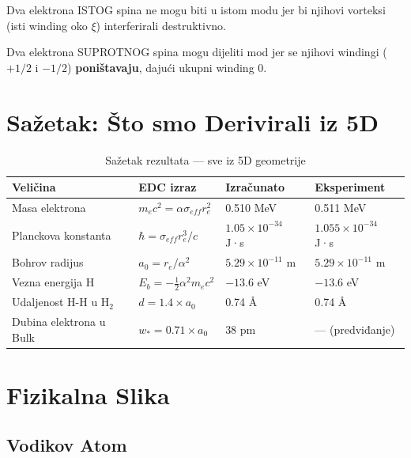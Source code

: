 \documentclass[12pt,a4paper]{article}
\begin{document}
\begin{edcprinciple}
Dva elektrona ISTOG spina ne mogu biti u istom modu jer bi njihovi vorteksi (isti winding oko $\xi$) interferirali destruktivno.

Dva elektrona SUPROTNOG spina mogu dijeliti mod jer se njihovi windingi ($+1/2$ i $-1/2$) \textbf{poništavaju}, dajući ukupni winding 0.
\end{edcprinciple}

\section{Sažetak: Što smo Derivirali iz 5D}

\begin{table}[H]
\centering
\begin{tabular}{@{}llll@{}}
\toprule
\textbf{Veličina} & \textbf{EDC izraz} & \textbf{Izračunato} & \textbf{Eksperiment} \\
\midrule
Masa elektrona & $m_e c^2 = \alpha \sigma_{eff} r_e^2$ & 0.510 MeV & 0.511 MeV \\
Planckova konstanta & $\hbar = \sigma_{eff} r_e^3 / c$ & $1.05 \times 10^{-34}$ J·s & $1.055 \times 10^{-34}$ J·s \\
Bohrov radijus & $a_0 = r_e / \alpha^2$ & $5.29 \times 10^{-11}$ m & $5.29 \times 10^{-11}$ m \\
Vezna energija H & $E_b = -\frac{1}{2}\alpha^2 m_e c^2$ & $-13.6$ eV & $-13.6$ eV \\
Udaljenost H-H u H$_2$ & $d = 1.4 \times a_0$ & 0.74 Å & 0.74 Å \\
Dubina elektrona u Bulk & $w_* = 0.71 \times a_0$ & 38 pm & — (predviđanje) \\
\bottomrule
\end{tabular}
\caption{Sažetak rezultata — sve iz 5D geometrije}
\end{table}

\section{Fizikalna Slika}

\subsection{Vodikov Atom}
\end{document}

